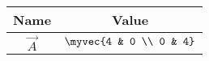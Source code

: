\begin{tabular}{|c|c|}
\hline
\textbf{Name} & \textbf{Value} \\ \hline
$\vec{A}$ & $\myvec{4 & 0 \\ 0 & 4}$ \\ \hline
\end{tabular}
